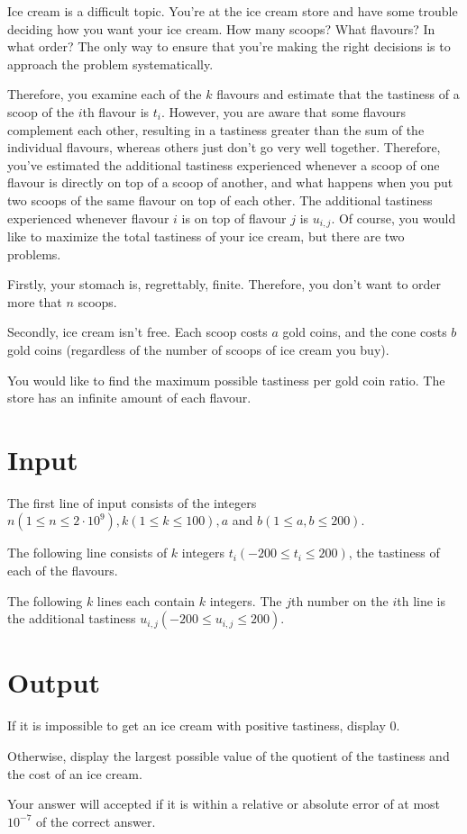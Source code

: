 Ice cream is a difficult topic. You're at the ice cream store and have some trouble deciding how you want your ice cream. How many scoops? What flavours? In what order? The only way to ensure that you're making the right decisions is to approach the problem systematically.

Therefore, you examine each of the $k$ flavours and estimate that the tastiness of a scoop of the $i$th flavour is $t_i$. However, you are aware that some flavours complement each other, resulting in a tastiness greater than the sum of the individual flavours, whereas others just don't go very well together. Therefore, you've estimated the additional tastiness experienced whenever a scoop of one flavour is directly on top of a scoop of another, and what happens when you put two scoops of the same flavour on top of each other. The additional tastiness experienced whenever flavour $i$ is on top of flavour $j$ is $u_{i,j}$.
Of course, you would like to maximize the total tastiness of your ice cream, but there are two problems.

Firstly, your stomach is, regrettably, finite. Therefore, you don't want to order more that $n$ scoops. 

Secondly, ice cream isn't free. Each scoop costs $a$ gold coins, and the cone costs $b$ gold coins (regardless of the number of scoops of ice cream you buy).

You would like to find the maximum possible tastiness per gold coin ratio. The store has an infinite amount of each flavour.

\section*{Input}
The first line of input consists of the integers $n (1 \leq n \leq 2 \cdot 10^9), k (1 \leq k \leq 100), a$ and $b (1 \leq a,b \leq 200)$.

The following line consists of $k$ integers $t_i (-200 \leq t_i \leq 200)$, the tastiness of each of the flavours.

The following $k$ lines each contain $k$ integers. The $j$th number on the $i$th line is the additional tastiness $u_{i,j} (-200 \leq u_{i,j} \leq 200)$.

\section*{Output}
If it is impossible to get an ice cream with positive tastiness, display $0$.

Otherwise, display the largest possible value of the quotient of the tastiness and the cost of an ice cream.

Your answer will accepted if it is within a relative or absolute error of at most $10^{-7}$ of the correct answer.
